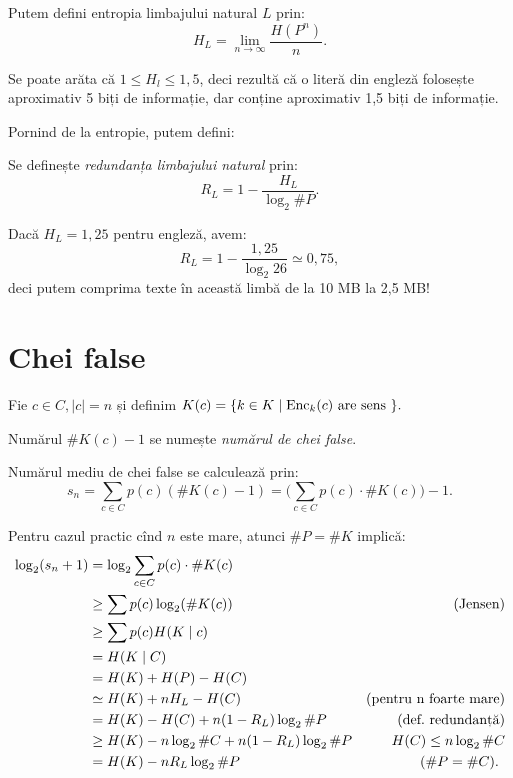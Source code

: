 \begin{definition}\label{def:entropie-lb-nat}
  Putem defini entropia limbajului natural $ L $ prin:
  \[
    H_L = \lim_{n \to \infty} \frac{H(P^n)}{n}.
  \]
\end{definition}

Se poate arăta că $ 1 \leq H_l \leq 1,5 $, deci rezultă că o literă
din engleză folosește aproximativ 5 biți de informație, dar
conține aproximativ 1,5 biți de informație.

Pornind de la entropie, putem defini:
\begin{definition}\label{def:redundanta-limbaj}
  Se definește \emph{redundanța limbajului natural} prin:
  \[
    R_L = 1 - \dfrac{H_L}{\log_2 \# P}.
  \]
\end{definition}
Dacă $ H_L = 1,25 $ pentru engleză, avem:
\[
  R_L = 1 - \frac{1,25}{\log_2 26} \simeq 0,75,
\]
deci putem comprima texte în această limbă de la 10 MB la 2,5 MB!

\section{Chei false}

Fie $ c \in C, | c | = n $ și definim $ K(c) = \{k \in K \mid \mathrm{Enc}_k(c) \text{ are sens } \}. $

Numărul $ \# K(c) - 1 $ se numește \emph{numărul de chei false}.

Numărul mediu de chei false se calculează prin:
\[
  s_n = \sum_{c \in C} p(c)(\# K(c) - 1) = \Big(\sum_{c \in C} p(c) \cdot \# K(c)\Big) - 1.
\]

Pentru cazul practic cînd $ n $ este mare, atunci $ \# P = \# K $ implică:
\begin{align*}
  \log_2(s_n + 1) &= \log_2 \sum_{c \in C} p(c) \cdot \# K(c) \\
                  &\geq \sum p(c) \log_2 (\# K(c)) & \pushright{\hfill\text{(Jensen)}} \\
                  &\geq \sum p(c) H(K \mid c) \\
                  &= H(K \mid C) \\
                  &= H(K) + H(P) - H(C) \\
                  &\simeq H(K) + nH_L - H(C) & \pushright{\hfill\text{(pentru n foarte mare)}} \\
                  &= H(K) - H(C) + n(1 - R_L) \log_2 \# P &  \pushright{\hfill\text{(def.\ redundanță)}} \\
                  &\geq H(K) - n \log_2 \# C + n(1 - R_L) \log_2 \# P %
                    & \pushright{H(C) \leq n \log_2 \# C} \\
                  &= H(K) - nR_L \log_2 \# P & \pushright{\hfill(\# P = \# C)}.
\end{align*}

